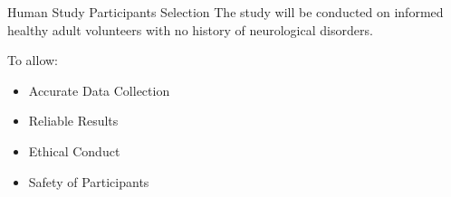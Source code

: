 \begin{frame}{Human Study \textemdash{} Participants Selection}
    The study will be conducted on informed healthy adult volunteers with no history of neurological disorders.

    To allow:
    \begin{itemize}
        \item Accurate Data Collection
        \item Reliable Results
        \item Ethical Conduct
        \item Safety of Participants
    \end{itemize}
\end{frame}
